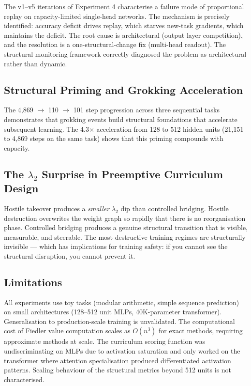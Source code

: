\documentclass[10pt,twocolumn]{article}
\begin{document}
The v1--v5 iterations of Experiment 4 characterise a failure mode of proportional replay on capacity-limited single-head networks. The mechanism is precisely identified: accuracy deficit drives replay, which starves new-task gradients, which maintains the deficit. The root cause is architectural (output layer competition), and the resolution is a one-structural-change fix (multi-head readout). The structural monitoring framework correctly diagnosed the problem as architectural rather than dynamic.

\subsection{Structural Priming and Grokking Acceleration}

The 4,869 $\to$ 110 $\to$ 101 step progression across three sequential tasks demonstrates that grokking events build structural foundations that accelerate subsequent learning. The 4.3$\times$ acceleration from 128 to 512 hidden units (21,151 to 4,869 steps on the same task) shows that this priming compounds with capacity.

\subsection{The $\lambda_2$ Surprise in Preemptive Curriculum Design}

Hostile takeover produces a \textit{smaller} $\lambda_2$ dip than controlled bridging. Hostile destruction overwrites the weight graph so rapidly that there is no reorganisation phase. Controlled bridging produces a genuine structural transition that is visible, measurable, and steerable. The most destructive training regimes are structurally invisible — which has implications for training safety: if you cannot see the structural disruption, you cannot prevent it.

\subsection{Limitations}

All experiments use toy tasks (modular arithmetic, simple sequence prediction) on small architectures (128--512 unit MLPs, 40K-parameter transformer). Generalisation to production-scale training is unvalidated. The computational cost of Fiedler value computation scales as $O(n^3)$ for exact methods, requiring approximate methods at scale. The curriculum scoring function was undiscriminating on MLPs due to activation saturation and only worked on the transformer where attention specialisation produced differentiated activation patterns. Scaling behaviour of the structural metrics beyond 512 units is not characterised.
\end{document}
